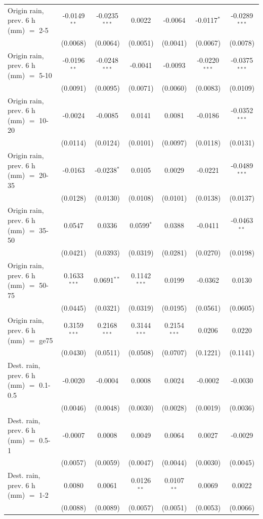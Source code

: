 \begin{tabular}{lcccccc}
   Origin rain, prev. 6 h (mm) $=$ 2-5 & -0.0149$^{**}$ & -0.0235$^{***}$ & 0.0022 & -0.0064 & -0.0117$^{*}$ & -0.0289$^{***}$\\
    & (0.0068) & (0.0064) & (0.0051) & (0.0041) & (0.0067) & (0.0078)\\
   Origin rain, prev. 6 h (mm) $=$ 5-10 & -0.0196$^{**}$ & -0.0248$^{***}$ & -0.0041 & -0.0093 & -0.0220$^{***}$ & -0.0375$^{***}$\\
    & (0.0091) & (0.0095) & (0.0071) & (0.0060) & (0.0083) & (0.0109)\\
   Origin rain, prev. 6 h (mm) $=$ 10-20 & -0.0024 & -0.0085 & 0.0141 & 0.0081 & -0.0186 & -0.0352$^{***}$\\
    & (0.0114) & (0.0124) & (0.0101) & (0.0097) & (0.0118) & (0.0131)\\
   Origin rain, prev. 6 h (mm) $=$ 20-35 & -0.0163 & -0.0238$^{*}$ & 0.0105 & 0.0029 & -0.0221 & -0.0489$^{***}$\\
    & (0.0128) & (0.0130) & (0.0108) & (0.0101) & (0.0138) & (0.0137)\\
   Origin rain, prev. 6 h (mm) $=$ 35-50 & 0.0547 & 0.0336 & 0.0599$^{*}$ & 0.0388 & -0.0411 & -0.0463$^{**}$\\
    & (0.0421) & (0.0393) & (0.0319) & (0.0281) & (0.0270) & (0.0198)\\
   Origin rain, prev. 6 h (mm) $=$ 50-75 & 0.1633$^{***}$ & 0.0691$^{**}$ & 0.1142$^{***}$ & 0.0199 & -0.0362 & 0.0130\\
    & (0.0445) & (0.0321) & (0.0319) & (0.0195) & (0.0561) & (0.0605)\\
   Origin rain, prev. 6 h (mm) $=$ ge75 & 0.3159$^{***}$ & 0.2168$^{***}$ & 0.3144$^{***}$ & 0.2154$^{***}$ & 0.0206 & 0.0220\\
    & (0.0430) & (0.0511) & (0.0508) & (0.0707) & (0.1221) & (0.1141)\\
   Dest. rain, prev. 6 h (mm) $=$ 0.1-0.5 & -0.0020 & -0.0004 & 0.0008 & 0.0024 & -0.0002 & -0.0030\\
    & (0.0046) & (0.0048) & (0.0030) & (0.0028) & (0.0019) & (0.0036)\\
   Dest. rain, prev. 6 h (mm) $=$ 0.5-1 & -0.0007 & 0.0008 & 0.0049 & 0.0064 & 0.0027 & -0.0029\\
    & (0.0057) & (0.0059) & (0.0047) & (0.0044) & (0.0030) & (0.0045)\\
   Dest. rain, prev. 6 h (mm) $=$ 1-2 & 0.0080 & 0.0061 & 0.0126$^{**}$ & 0.0107$^{**}$ & 0.0069 & 0.0022\\
    & (0.0088) & (0.0089) & (0.0057) & (0.0051) & (0.0053) & (0.0066)\\

\end{tabular}
